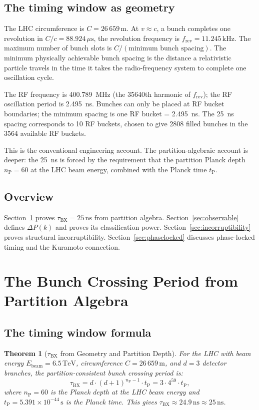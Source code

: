 \documentclass[twocolumn,10pt,a4paper]{article}
\theoremstyle{thmstyle}
\newtheorem{theorem}{Theorem}[section]
\theoremstyle{definition}
\theoremstyle{remark}
\newcommand{\nP}{n_{\mathrm{P}}}
\newcommand{\tP}{t_{\mathrm{P}}}
\newcommand{\tBX}{\tau_{\mathrm{BX}}}
\newcommand{\DeltaP}{\Delta P}
\begin{document}
\subsection{The timing window as geometry}

The LHC circumference is $C = 26\,659\,\mathrm{m}$. At $v \approx c$,
a bunch completes one revolution in $C/c = 88.924\,\mu\mathrm{s}$,
the revolution frequency is $f_{\mathrm{rev}} = 11.245\,\mathrm{kHz}$.
The maximum number of bunch slots is $C/(\text{minimum bunch spacing})$.
The minimum physically achievable bunch spacing is the distance a relativistic
particle travels in the time it takes the radio-frequency system to
complete one oscillation cycle.

The RF frequency is 400.789~MHz (the 35640th harmonic of $f_{\mathrm{rev}}$);
the RF oscillation period is 2.495~ns. Bunches can only be placed at
RF bucket boundaries; the minimum spacing is one RF bucket = 2.495~ns.
The 25~ns spacing corresponds to 10 RF buckets, chosen to give 2808 filled
bunches in the 3564 available RF buckets.

This is the conventional engineering account. The partition-algebraic
account is deeper: the 25~ns is forced by the requirement that the
partition Planck depth $\nP = 60$ at the LHC beam energy, combined
with the Planck time $\tP$.

\subsection{Overview}

Section~\ref{sec:tbx} proves $\tBX = 25\,\mathrm{ns}$ from partition algebra.
Section~\ref{sec:observable} defines $\DeltaP(k)$ and proves its
classification power.
Section~\ref{sec:incorruptibility} proves structural incorruptibility.
Section~\ref{sec:phaselocked} discusses phase-locked timing and the
Kuramoto connection.

\section{The Bunch Crossing Period from Partition Algebra}
\label{sec:tbx}

\subsection{The timing window formula}

\begin{theorem}[$\tBX$ from Geometry and Partition Depth]
\label{thm:tbx_determined}
For the LHC with beam energy $E_{\mathrm{beam}} = 6.5\,\mathrm{TeV}$,
circumference $C = 26\,659\,\mathrm{m}$, and $d = 3$ detector branches,
the partition-consistent bunch crossing period is:
\begin{equation}
\tBX = d \cdot (d+1)^{\nP - 1} \cdot \tP = 3 \cdot 4^{59} \cdot \tP,
\label{eq:tbx}
\end{equation}
where $\nP = 60$ is the Planck depth at the LHC beam energy
\citep{companion:planck} and $\tP = 5.391 \times 10^{-44}\,\mathrm{s}$
is the Planck time. This gives $\tBX \approx 24.9\,\mathrm{ns}
\approx 25\,\mathrm{ns}$.
\end{theorem}
\end{document}
